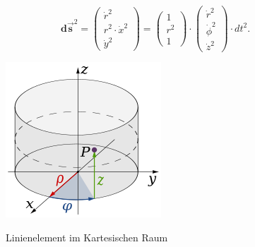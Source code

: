 \begin{equation}
	\mathbf{d\vec{s}}^2 = \begin{pmatrix} \dot{r}^2 \\ r^2 \cdot \dot{x}^2 \\ \dot{y}^2 \end{pmatrix} = \begin{pmatrix} 1 \\ r^2 \\ 1 \end{pmatrix} \cdot \begin{pmatrix} \dot{r}^2 \\ \dot{\phi}^2 \\ \dot{z}^2 \end{pmatrix} \cdot dt^2 .
\end{equation}


\begin{figure}
	\centering
	\includegraphics[width=0.7\linewidth]{papers/geodaeten/Abbildungen/Linienelemente/LinZyl1}
	\caption{Linienelement im Kartesischen Raum}
	\label{geodaeten:Linienelemente:figure2}
	\cite{geodaeten:polarkoordinaten}
\end{figure}

